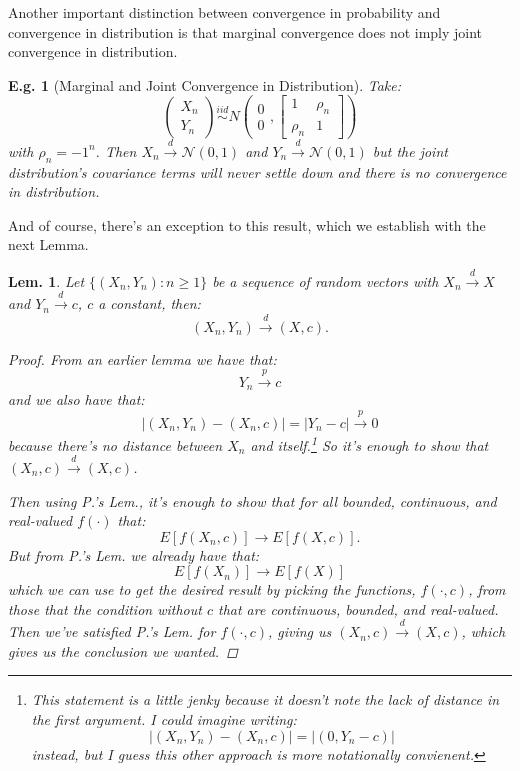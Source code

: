 \documentclass{tufte-book}
\theoremstyle{mytheoremstyle}
\theoremstyle{mylemstyle}
\newtheorem*{lem}{Lem.}
\theoremstyle{mydefstyle}
\newtheorem*{ex}{E.g.}
\begin{document}
Another important distinction between convergence in probability and convergence in distribution is that marginal convergence does not imply joint convergence in distribution. 
\begin{ex}[Marginal and Joint Convergence in Distribution] Take:
	\[ \left( \begin{array}{ccc}
		X_n  \\
		Y_n 	\end{array} \right)\overset{iid}{\sim}N \left(  \begin{array}{ccc} 0 \\ 0 \end{array} , \left[\begin{array}{ccc} 1 & \rho_n \\ \rho_n & 1 \end{array} \right] \right) \]
	with \(\rho_n = -1^{n}\). Then \(X_n \overset{d}{\rightarrow} \mathcal{N}(0, 1)\) and \(Y_n \overset{d}{\rightarrow} \mathcal{N}(0, 1)\) but the joint distribution's covariance terms will never settle down and there is no convergence in distribution. 
\end{ex}
\noindent And of course, there's an exception to this result, which we establish with the next Lemma. 
\begin{lem} Let \(\{(X_n, Y_n): n \ge 1\}\) be a sequence of random vectors with \(X_n \overset{d}{\rightarrow} X\) and \(Y_n \overset{d}{\rightarrow} c\), \(c\) a constant, then: 
	\[(X_n, Y_n) \overset{d}{\rightarrow} (X, c) \text{.}\]
	\begin{proof}
		From an earlier lemma we have that:
			\[Y_n \overset{p}{\rightarrow} c\]
		and we also have that:
			\[|(X_n, Y_n) - (X_n, c)| = |Y_n - c| \overset{p}{\rightarrow} 0\]
		because there's no distance between \(X_n\) and itself.\footnote{This statement is a little jenky because it doesn't note the lack of distance in the first argument. I could imagine writing:\[|(X_n, Y_n) - (X_n, c)| = |(0, Y_n - c)| \] instead, but I guess this other approach is more notationally convienent.} So it's enough to show that \((X_n, c) \overset{d}{\rightarrow} (X, c)\).
		
		Then using P.'s Lem., it's enough to show that for all bounded, continuous, and real-valued \(f(\cdot)\) that:
			\[E[f(X_n, c)] \rightarrow E[f(X, c)] \text{.}\]
		But from P.'s Lem. we already have that:
			\[E[f(X_n)] \rightarrow E[f(X)]\]
		which we can use to get the desired result by picking the functions, \(f(\cdot, c)\), from those that the condition without \(c\) that are continuous, bounded, and real-valued. Then we've satisfied P.'s Lem. for \(f(\cdot, c)\), giving us \((X_n,c) \overset{d}{\rightarrow} (X, c)\), which gives us the conclusion we wanted. 
	\end{proof}
\end{lem}
\end{document}
